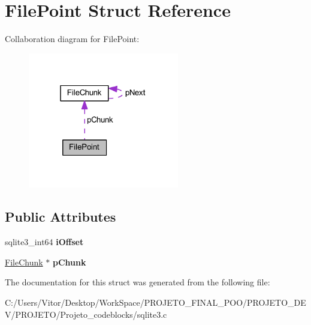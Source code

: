 \hypertarget{struct_file_point}{\section{File\-Point Struct Reference}
\label{struct_file_point}
}


Collaboration diagram for File\-Point\-:\nopagebreak
\begin{figure}[H]
\begin{center}
\leavevmode
\includegraphics[width=187pt]{struct_file_point__coll__graph}
\end{center}
\end{figure}
\subsection*{Public Attributes}
\begin{DoxyCompactItemize}
\item 
\hypertarget{struct_file_point_a00a345e479cd37ebeb9e6ed475eb4112}{sqlite3\-\_\-int64 {\bfseries i\-Offset}}\label{struct_file_point_a00a345e479cd37ebeb9e6ed475eb4112}

\item 
\hypertarget{struct_file_point_aa17216d9d2559f14a00a2c72a8959298}{\hyperlink{struct_file_chunk}{File\-Chunk} $\ast$ {\bfseries p\-Chunk}}\label{struct_file_point_aa17216d9d2559f14a00a2c72a8959298}

\end{DoxyCompactItemize}


The documentation for this struct was generated from the following file\-:\begin{DoxyCompactItemize}
\item 
C\-:/\-Users/\-Vitor/\-Desktop/\-Work\-Space/\-P\-R\-O\-J\-E\-T\-O\-\_\-\-F\-I\-N\-A\-L\-\_\-\-P\-O\-O/\-P\-R\-O\-J\-E\-T\-O\-\_\-\-D\-E\-V/\-P\-R\-O\-J\-E\-T\-O/\-Projeto\-\_\-codeblocks/sqlite3.\-c\end{DoxyCompactItemize}
